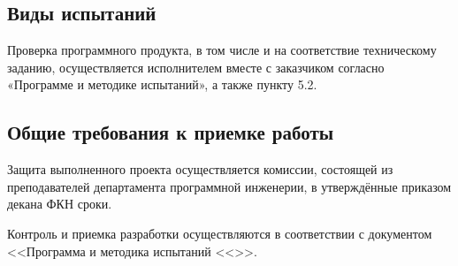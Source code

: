 \documentclass[a4paper,12pt,reqno]{article}
\begin{document}
    \subsection{Виды испытаний}
    Проверка программного продукта, в том числе и на соответствие техническому заданию, осуществляется исполнителем вместе с заказчиком согласно «Программе и методике испытаний», а также пункту 5.2.

    \subsection{Общие требования к приемке работы}
    Защита выполненного проекта осуществляется комиссии, состоящей из преподавателей департамента программной инженерии, в утверждённые приказом декана ФКН сроки.

    Контроль и приемка разработки осуществляются в соответствии с документом <<Программа и методика испытаний <<\unskip>>.
    \newpage

    
    \newpage

    \printbibliography[title=Список источников, heading=bibintoc]

    \newpage

    \listRegistration
\end{document}
